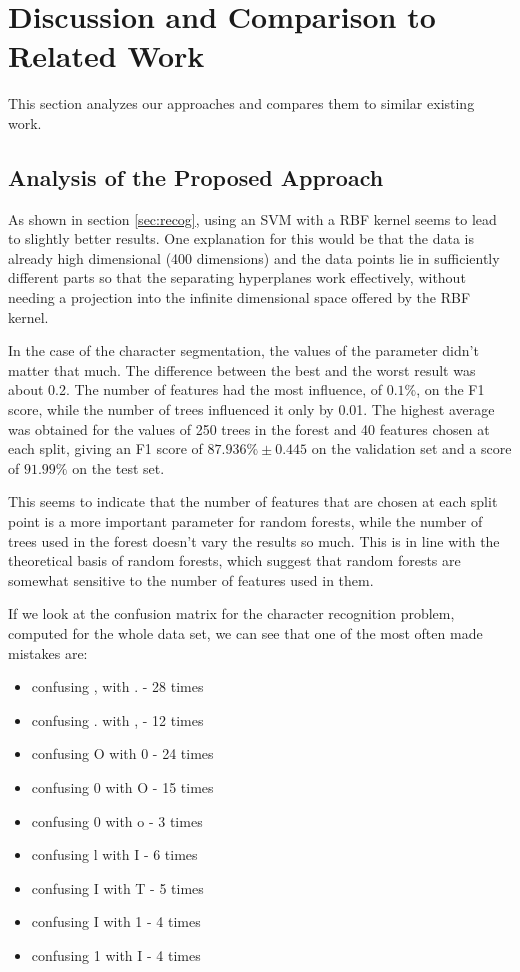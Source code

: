 \section{Discussion and Comparison to Related Work}
\label{sec:disc}

This section analyzes our approaches and compares them to similar existing work.

\subsection{Analysis of the Proposed Approach}
As shown in section \ref{sec:recog}, using an SVM with a RBF kernel seems to lead to slightly better results. One explanation for this would be that the data is already high dimensional (400 dimensions) and the data points lie in sufficiently different parts so that the separating hyperplanes work effectively, without needing a projection into the infinite dimensional space offered by the RBF kernel. 

In the case of the character segmentation, the values of the parameter didn't matter that much. The difference between the best and the worst result was about 0.2. The number of features had the most influence, of $ 0.1\% $, on the F1 score, while the number of trees influenced it only by 0.01. The highest average was obtained for the values of 250 trees in the forest and 40 features chosen at each split, giving an F1 score of $ 87.936\% \pm 0.445$ on the validation set and a score of $ 91.99\% $ on the test set.  

This seems to indicate that the number of features that are chosen at each split point is a more important parameter for random forests, while the number of trees used in the forest doesn't vary the results so much. This is in line with the theoretical basis of random forests\cite{breiman2001random}, which suggest that random forests are somewhat sensitive to the number of features used in them. 

If we look at the confusion matrix for the character recognition problem, computed for the whole data set, we can see that one of the most often made mistakes are:
\begin{itemize}
\item confusing , with . - 28 times
\item confusing . with , - 12 times
\item confusing O with 0 - 24 times
\item confusing 0 with O - 15 times
\item confusing 0 with o - 3 times
\item confusing l with I - 6 times
\item confusing I with T - 5 times
\item confusing I with 1 - 4 times
\item confusing 1 with I - 4 times
\end{itemize} 

